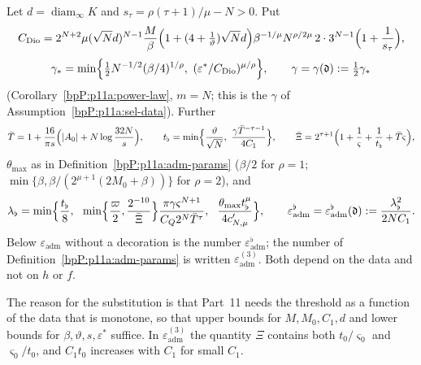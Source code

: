 \begin{definition}\label{bpP:p11a:thresholds}
Let $d=\operatorname{diam}_\infty K$ and $s_\tau=\rho(\tau+1)/\mu-N>0$. Put
\[C_{\mathrm{Dio}}=2^{N+2}\mu(\sqrt Nd)^{N-1}\frac M\beta\Bigl(1+(4+\tfrac1\vartheta)\sqrt Nd\Bigr)\beta^{-1/\mu}N^{\rho/2\mu}\,2\cdot3^{N-1}\Bigl(1+\frac1{s_\tau}\Bigr),\]
\[\gamma_*=\min\Bigl\{\tfrac12N^{-1/2}(\beta/4)^{1/\rho},\ (\varepsilon^*/C_{\mathrm{Dio}})^{\mu/\rho}\Bigr\},\qquad \gamma=\gamma(\mathfrak d):=\tfrac12\gamma_*\]
(Corollary~\ref{bpP:p11a:power-law}, $m=N$; this is the $\gamma$ of Assumption~\ref{bpP:p11a:sel-data}). Further
\[\bar T=1+\frac{16}{\pi s}\Bigl(\lvert A_0\rvert+N\log\frac{32N}s\Bigr),\qquad t_\flat=\min\Bigl\{\frac\vartheta{\sqrt N},\ \frac{\gamma\bar T^{-\tau-1}}{4C_1}\Bigr\},\qquad\bar\Xi=2^{\tau+1}\Bigl(1+\frac1\varsigma+\frac1{t_\flat}+\bar T\varsigma\Bigr),\]
$\theta_{\max}$ as in Definition~\ref{bpP:p11a:adm-params} ($\beta/2$ for $\rho=1$; $\min\{\beta,\beta/(2^{\mu+1}(2M_0+\beta))\}$ for $\rho=2$), and
\[\lambda_\flat=\min\Bigl\{\frac{t_\flat}8,\ \ \min\Bigl\{\frac\varpi2,\frac{2^{-10}}{\bar\Xi}\Bigr\}\frac{\pi\gamma\varsigma^{N+1}}{C_Q2^N\bar T^{\tau}},\ \ \frac{\theta_{\max}t_\flat^\mu}{4c'_{N,\mu}}\Bigr\},\qquad\varepsilon^\flat_{\mathrm{adm}}=\varepsilon^\flat_{\mathrm{adm}}(\mathfrak d):=\frac{\lambda_\flat^2}{2NC_1}.\]
Below $\varepsilon_{\mathrm{adm}}$ without a decoration is the number $\varepsilon_{\mathrm{adm}}^\flat$; the number of Definition~\ref{bpP:p11a:adm-params} is written $\varepsilon_{\mathrm{adm}}^{(3)}$. Both depend on the data and not on $h$ or $f$.
\end{definition}

The reason for the substitution is that Part~11 needs the threshold as a function of the data that is monotone, so that upper bounds for $M,M_0,C_1,d$ and lower bounds for $\beta,\vartheta,s,\varepsilon^*$ suffice. In $\varepsilon^{(3)}_{\mathrm{adm}}$ the quantity $\Xi$ contains both $t_0/\varsigma_0$ and $\varsigma_0/t_0$, and $C_1t_0$ increases with $C_1$ for small $C_1$.

